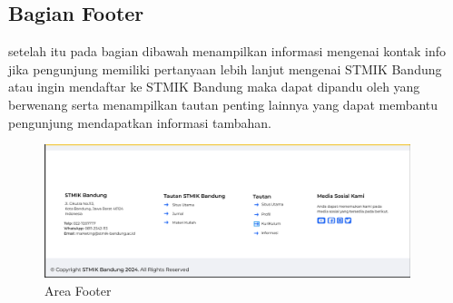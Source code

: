 \documentclass[a4paper, 12pt]{article}
\begin{document}
\subsection{Bagian Footer}
setelah itu pada bagian dibawah menampilkan informasi mengenai kontak info jika pengunjung memiliki pertanyaan lebih lanjut mengenai STMIK Bandung atau ingin mendaftar ke STMIK Bandung maka dapat dipandu oleh yang berwenang serta menampilkan tautan penting lainnya yang dapat membantu pengunjung mendapatkan informasi tambahan.
\begin{figure}[H]
  \begin{center}
    \includegraphics[width=0.95\textwidth]{images/gambar6.png}
  \end{center}
  \caption{Area Footer}\label{fig:footer}
\end{figure}
\end{document}
